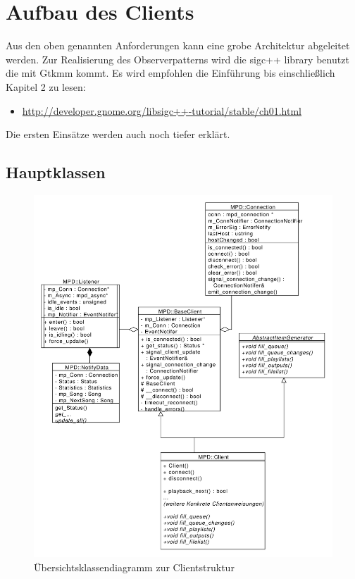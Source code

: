 \section{Aufbau des Clients}

Aus den oben genannten Anforderungen kann eine grobe Architektur abgeleitet werden.
Zur Realisierung des Observerpatterns wird die sigc++ library benutzt die mit Gtkmm kommt.
Es wird empfohlen die Einführung bis einschließlich Kapitel 2 zu lesen:
\begin{itemize}
\item \url{http://developer.gnome.org/libsigc++-tutorial/stable/ch01.html}
\end{itemize}
Die ersten Einsätze werden auch noch tiefer erklärt.


\subsection{Hauptklassen}
\begin{figure}[htb!]
	\centering
        \includegraphics[scale=0.5]{ClientCollab.pdf}
	\caption{Übersichtsklassendiagramm zur Clientstruktur}
	\label{class_client_all}
\end{figure}

